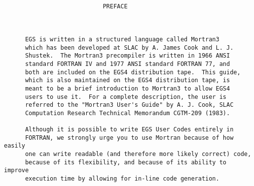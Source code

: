 \newpage \begin{verbatim}
 
 
                            PREFACE
 
 
 
      EGS is written in a structured language called Mortran3
      which has been developed at SLAC by A. James Cook and L. J.
      Shustek.  The Mortran3 precompiler is written in 1966 ANSI
      standard FORTRAN IV and 1977 ANSI standard FORTRAN 77, and
      both are included on the EGS4 distribution tape.  This guide,
      which is also maintained on the EGS4 distribution tape, is
      meant to be a brief introduction to Mortran3 to allow EGS4
      users to use it.  For a complete description, the user is
      referred to the "Mortran3 User's Guide" by A. J. Cook, SLAC
      Computation Research Technical Memorandum CGTM-209 (1983).
      
      Although it is possible to write EGS User Codes entirely in
      FORTRAN, we strongly urge you to use Mortran because of how easily
      one can write readable (and therefore more likely correct) code,
      because of its flexibility, and because of its ability to improve
      execution time by allowing for in-line code generation.


















\end{verbatim} 

\newpage

